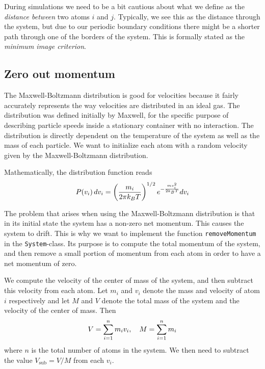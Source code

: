 \documentclass[a4paper]{article}
\begin{document}
    During simulations we need to be a bit cautious about what we define as the
    \emph{distance between} two atoms $i$ and $j$. Typically, we see this as
    the distance through the system, but due to our periodic boundary
    conditions there might be a shorter path through one of the borders of the
    system. This is formally stated as the \emph{minimum image
    criterion}\cite{min_image}.
    
\subsection{Zero out momentum}
\label{sub:zero_out_momentum}

    The Maxwell-Boltzmann distribution is good for velocities because it fairly
    accurately represents the way velocities are distributed in an ideal gas.
    The distribution was defined initially by Maxwell, for the specific purpose
    of describing particle speeds inside a stationary container with no
    interaction.  The distribution is directly dependent on the temperature of
    the system as well as the mass of each particle. We want to initialize each
    atom with a random velocity given by the Maxwell-Boltzmann distribution.

    Mathematically, the distribution function reads
    \begin{equation}
        \notag
        P(v_i)\, dv_i = \left( \frac{m_i}{2\pi k_BT} \right)^{1/2} e^{-\frac{mv_i^2}{2k_BT}}dv_i
    \end{equation}
    
    The problem that arises when using the Maxwell-Boltzmann distribution is
    that in its initial state the system has a non-zero net momentum. This
    causes the system to drift. This is why we want to implement the function
    \texttt{removeMomentum} in the \texttt{System}-class. Its purpose is to
    compute the total momentum of the system, and then remove a small portion
    of momentum from each atom in order to have a net momentum of zero. 
    
    We compute the velocity of the center of mass of the system, and then
    subtract this velocity from each atom.  Let $m_i$ and $v_i$ denote the mass
    and velocity of atom $i$ respectively and let $M$ and $V$ denote the total
    mass of the system and the velocity of the center of mass. Then
    \begin{align*}
        \notag
        V = \sum^{n}_{i=1} m_i v_i, \quad M = \sum^{n}_{i=1} m_i
    \end{align*}
    where $n$ is the total number of atoms in the system. We then need to
    subtract the value $V_{\mathrm{sub}} = V / M$ from each $v_i$.
\end{document}
